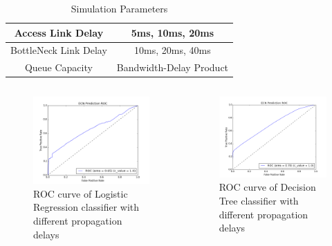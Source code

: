 \documentclass{beamer}
\begin{document}
\begin{frame}
\begin{table}
\begin{center}
\caption {Simulation Parameters} \label{tab:varyRTT}
\begin{tabular}{ |c|c| }
 \hline
 Access Link Delay & 5ms, 10ms, 20ms  \\
 \hline
 BottleNeck Link Delay & 10ms, 20ms, 40ms\\
 \hline
 Queue Capacity & Bandwidth-Delay Product\\
 \hline
\end{tabular}
\end{center}
\end{table}
 \begin{columns}[c]
\begin{figure}
\includegraphics[width=5cm]{LRRocDiffProp.png}
\caption{ROC curve of Logistic Regression classifier with different propagation delays}
\label{LRROCDiff}
\end{figure}
\begin{figure}
\includegraphics[width=5cm]{DTRocDiffProp.png}
\caption{ROC curve of Decision Tree classifier with different propagation delays}
\label{DTROCDiff}
\end{figure}
\end{columns}


\end{frame}
\end{document}
